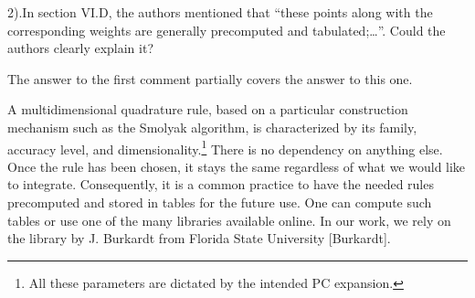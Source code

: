 \begin{reviewer}
2).In section VI.D, the authors mentioned that ``these points along with the corresponding weights are generally precomputed and tabulated;\ldots''. Could the authors clearly explain it?
\end{reviewer}
\begin{authors}
The answer to the first comment partially covers the answer to this one.

A multidimensional quadrature rule, based on a particular construction mechanism such as the Smolyak algorithm, is characterized by its family, accuracy level, and dimensionality.\footnote{All these parameters are dictated by the intended PC expansion.}
There is no dependency on anything else.
Once the rule has been chosen, it stays the same regardless of what we would like to integrate.
Consequently, it is a common practice to have the needed rules precomputed and stored in tables for the future use.
One can compute such tables or use one of the many libraries available online.
In our work, we rely on the library by J. Burkardt from Florida State University [Burkardt].

\begin{actions}
\end{actions}
\end{authors}

